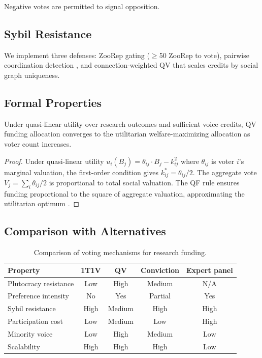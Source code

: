 \documentclass[11pt,a4paper]{article}
\begin{document}
Negative votes are permitted to signal opposition.

\subsection{Sybil Resistance}

We implement three defenses: ZooRep gating ($\geq$50 ZooRep to vote),
pairwise coordination detection \citep{buterin2019flexible}, and
connection-weighted QV that scales credits by social graph uniqueness.

\subsection{Formal Properties}

\begin{theorem}
Under quasi-linear utility over research outcomes and sufficient voice
credits, QV funding allocation converges to the utilitarian
welfare-maximizing allocation as voter count increases.
\end{theorem}

\begin{proof}
Under quasi-linear utility $u_i(B_j) = \theta_{ij} \cdot B_j -
k_{ij}^2$ where $\theta_{ij}$ is voter $i$'s marginal valuation, the
first-order condition gives $k_{ij}^* = \theta_{ij} / 2$. The aggregate
vote $V_j = \sum_i \theta_{ij} / 2$ is proportional to total social
valuation. The QF rule ensures funding proportional to the square of
aggregate valuation, approximating the utilitarian optimum
\citep{lalley2018quadratic}.
\end{proof}

\subsection{Comparison with Alternatives}

\begin{table}[H]
\centering
\caption{Comparison of voting mechanisms for research funding.}
\label{tab:voting}
\begin{tabular}{p{3cm}cccc}
\toprule
\textbf{Property} & \textbf{1T1V} & \textbf{QV} &
  \textbf{Conviction} & \textbf{Expert panel} \\
\midrule
Plutocracy resistance & Low & High & Medium & N/A \\
Preference intensity & No & Yes & Partial & Yes \\
Sybil resistance & High & Medium & High & High \\
Participation cost & Low & Medium & Low & High \\
Minority voice & Low & High & Medium & Low \\
Scalability & High & High & High & Low \\
\bottomrule
\end{tabular}
\end{table}
\end{document}

